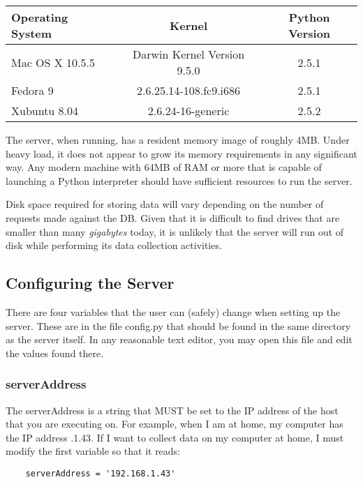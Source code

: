 \documentclass[12pt]{article}
\begin{document}
\begin{center}
\begin{tabular}{l|c|c}
	\hline
	{\strong Operating System} & {\strong Kernel} & {\strong Python Version} \\
	\hline
	\hline
	Mac OS X 10.5.5 & Darwin Kernel Version 9.5.0 & 2.5.1 \\
	Fedora 9 & 2.6.25.14-108.fc9.i686 & 2.5.1 \\
	Xubuntu 8.04 & 2.6.24-16-generic & 2.5.2 \\
	\hline
\end{tabular}
\end{center}

The server, when running, has a resident memory image of roughly 4MB. Under heavy load, it does not appear to grow its memory requirements in any significant way. Any modern machine with 64MB of RAM or more that is capable of launching a Python interpreter should have sufficient resources to run the server.

Disk space required for storing data will vary depending on the number of requests made against the DB. Given that it is difficult to find drives that are smaller than many {\em gigabytes} today, it is unlikely that the server will run out of disk while performing its data collection activities.

\subsection{Configuring the Server}
There are four variables that the user can (safely) change when setting up the server. These are in the file {\code config.py} that should be found in the same directory as the server itself. In any reasonable text editor, you may open this file and edit the values found there.

\subsubsection{{\code serverAddress}}
The {\code serverAddress} is a string that {\strong MUST} be set to the IP address of the host that you are executing on. For example, when I am at home, my computer has the IP address {.1.43}. If I want to collect data on my computer at home, I must modify the first variable so that it reads:

\begin{verbatim}
	serverAddress = '192.168.1.43'
\end{verbatim}
\end{document}

